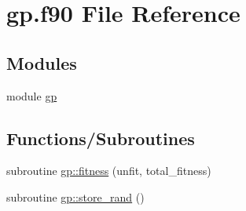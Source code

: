 \hypertarget{gp_8f90}{
\section{gp.f90 File Reference}
\label{gp_8f90}
}
\subsection*{Modules}
\begin{DoxyCompactItemize}
\item 
module \hyperlink{namespacegp}{gp}
\end{DoxyCompactItemize}
\subsection*{Functions/Subroutines}
\begin{DoxyCompactItemize}
\item 
subroutine \hyperlink{namespacegp_a0b4ea7e3d8474c9cb6eabeb9581a28b2}{gp::fitness} (unfit, total\_\-fitness)
\item 
subroutine \hyperlink{namespacegp_acef1117d5406847ad3fab8456f70bad7}{gp::store\_\-rand} ()
\end{DoxyCompactItemize}
